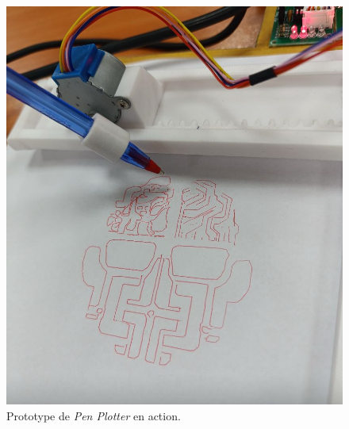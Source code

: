 \documentclass[12pt,a4paper]{article}
\begin{document}
\begin{figure}[h]
    \centering
    \includegraphics[width=\linewidth]{image4}
    \caption{Prototype de \textit{Pen Plotter} en action.}
\end{figure}
\end{document}
